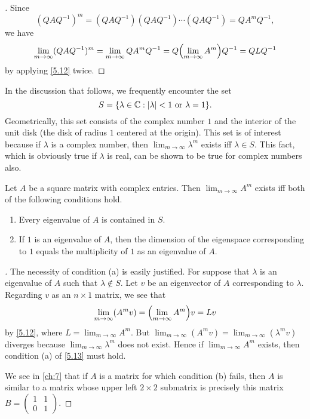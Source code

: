 \begin{proof}[]
  Since
  \[
    (Q A Q^{-1})^m = (Q A Q^{-1}) (Q A Q^{-1}) \cdots (Q A Q^{-1}) = Q A^m Q^{-1},
  \]
  we have
  \[
    \lim_{m \to \infty} (Q A Q^{-1})^m = \lim_{m \to \infty} Q A^m Q^{-1} = Q \pa{\lim_{m \to \infty} A^m} Q^{-1} = Q L Q^{-1}
  \]
  by applying \cref{5.12} twice.
\end{proof}

\begin{defn}\label{5.3.3}
  In the discussion that follows, we frequently encounter the set
  \[
    S = \set{\lambda \in \C : \abs{\lambda} < 1 \text{ or } \lambda = 1}.
  \]
  Geometrically, this set consists of the complex number \(1\) and the interior of the unit disk (the disk of radius \(1\) centered at the origin).
  This set is of interest because if \(\lambda\) is a complex number, then \(\lim_{m \to \infty} \lambda^m\) exists iff \(\lambda \in S\).
  This fact, which is obviously true if \(\lambda\) is real, can be shown to be true for complex numbers also.
\end{defn}

\begin{thm}\label{5.13}
  Let \(A\) be a square matrix with complex entries.
  Then \(\lim_{m \to \infty} A^m\) exists iff both of the following conditions hold.
  \begin{enumerate}
    \item Every eigenvalue of \(A\) is contained in \(S\).
    \item If \(1\) is an eigenvalue of \(A\), then the dimension of the eigenspace corresponding to \(1\) equals the multiplicity of \(1\) as an eigenvalue of \(A\).
  \end{enumerate}
\end{thm}

\begin{proof}[]
  The necessity of condition (a) is easily justified.
  For suppose that \(\lambda\) is an eigenvalue of \(A\) such that \(\lambda \notin S\).
  Let \(v\) be an eigenvector of \(A\) corresponding to \(\lambda\).
  Regarding \(v\) as an \(n \times 1\) matrix, we see that
  \[
    \lim_{m \to \infty} (A^m v) = \pa{\lim_{m \to \infty} A^m} v = Lv
  \]
  by \cref{5.12}, where \(L = \lim_{m \to \infty} A^m\).
  But \(\lim_{m \to \infty} (A^m v) = \lim_{m \to \infty} (\lambda^m v)\) diverges because \(\lim_{m \to \infty} \lambda^m\) does not exist.
  Hence if \(\lim_{m \to \infty} A^m\) exists, then condition (a) of \cref{5.13} must hold.

  We see in \cref{ch:7} that if \(A\) is a matrix for which condition (b) fails, then \(A\) is similar to a matrix whose upper left \(2 \times 2\) submatrix is precisely this matrix \(B = \begin{pmatrix}
    1 & 1 \\
    0 & 1
  \end{pmatrix}\).
\end{proof}

